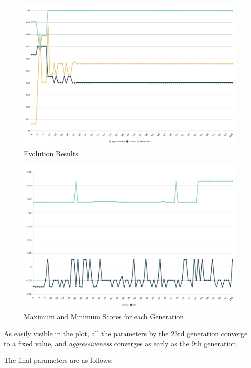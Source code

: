 \documentclass[sigconf]{acmart} %
\begin{document}
\begin{figure}[H]
    \centering
    \includegraphics[width=0.95\linewidth]{pictures/Graph_2_25.png}
    \caption{\label{fig:Graph_2_25} Evolution Results}
    
\end{figure}

\begin{figure}[H]
    \centering
    \includegraphics[width=0.9\linewidth]{pictures/Graph_minmax_225.png}
    \caption{\label{fig:min_max_225}Maximum and Minimum Scores for each Generation}
    
\end{figure}

As easily visible in the plot, all the parameters by the 23rd generation converge to a fixed value, and \textit{aggressiveness} converges as early as the 9th generation.

The final parameters are as follows:\\
\end{document}
